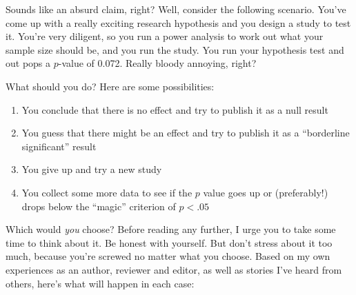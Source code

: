 Sounds like an absurd claim, right? Well, consider the following scenario. You've come up with a really exciting research hypothesis and you design a study to test it. You're very diligent, so you run a power analysis to work out what your sample size should be, and you run the study. You run your hypothesis test and out pops a $p$-value of 0.072. Really bloody annoying, right? 

What should you do? Here are some possibilities:
\begin{enumerate} \itemsep -2pt
\item You conclude that there is no effect and try to publish it as a null result
\item You guess that there might be an effect and try to publish it as a ``borderline significant'' result
\item You give up and try a new study
\item You collect some more data to see if the $p$ value goes up or (preferably!) drops below the ``magic'' criterion of $p<.05$
\end{enumerate}
Which would {\it you} choose? Before reading any further, I urge you to take some time to think about it. Be honest with yourself. But don't stress about it too much, because you're screwed no matter what you choose. Based on my own experiences as an author, reviewer and editor, as well as stories I've heard from others, here's what will happen in each case:

